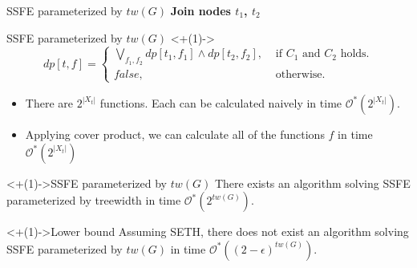 \documentclass{beamer}
\newcommand{\nextslide}[1]{\onslide<+(1)->{#1}}
\begin{document}
\begin{frame}[t]{SSFE parameterized by $tw(G)$}
\small
\textbf{Join nodes $t_1$, $t_2$}
\end{frame}

\begin{frame}[t]{SSFE parameterized by $tw(G)$}
\nextslide{
\begin{equation*}
dp[t,f] = \begin{cases}
\bigvee\limits_{f_1,f_2} dp[t_1,f_1] \land dp[t_2,f_2], &\text{ if $C_1$ and $C_2$ holds.} \\
false, &\text{ otherwise.}
\end{cases}
\end{equation*}
}

\setlength{\leftmargini}{2pt}
\begin{itemize}[<+(1)->]
\item[] There are $2^{|X_t|}$ functions. Each can be calculated naively in time $\mathcal{O}^*(2^{|X_t|})$.
\item[] Applying cover product, we can calculate all of the functions $f$ in time $\mathcal{O}^*(2^|X_t|)$ 
\end{itemize}
\begin{block}<+(1)->{SSFE parameterized by $tw(G)$}
There exists an algorithm solving SSFE parameterized by treewidth in time $\mathcal{O}^*(2^{tw(G)})$.
\end{block}
\begin{block}<+(1)->{Lower bound}
Assuming SETH, there does not exist an algorithm solving SSFE parameterized by $tw(G)$ in time $\mathcal{O}^*((2-\epsilon)^{tw(G)})$.
\end{block}
\end{frame}
\end{document}
